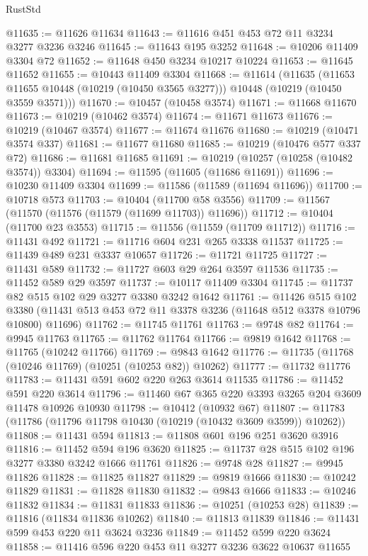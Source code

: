 \begin{lexlean}{RustStd}
\begin{coremodule}
@11635 := @11626 @11634
@11643 := @11616 @451 @453 @72 @11 @3234 @3277 @3236 @3246
@11645 := @11643 @195 @3252
@11648 := @10206 @11409 @3304 @72
@11652 := @11648 @450 @3234 @10217 @10224
@11653 := @11645 @11652
@11655 := @10443 @11409 @3304
@11668 := @11614
    (@11635
      (@11653 @11655 @10448 (@10219 (@10450 @3565 @3277)))
      @10448
      (@10219 (@10450 @3559 @3571)))
@11670 := @10457 (@10458 @3574)
@11671 := @11668 @11670
@11673 := @10219 (@10462 @3574)
@11674 := @11671 @11673
@11676 := @10219 (@10467 @3574)
@11677 := @11674 @11676
@11680 := @10219 (@10471 @3574 @337)
@11681 := @11677 @11680
@11685 := @10219 (@10476 @577 @337 @72)
@11686 := @11681 @11685
@11691 := @10219 (@10257 (@10258 (@10482 @3574)) @3304)
@11694 := @11595 (@11605 (@11686 @11691))
@11696 := @10230 @11409 @3304
@11699 := @11586 (@11589 (@11694 @11696))
@11700 := @10718 @573
@11703 := @10404 (@11700 @58 @3556)
@11709 := @11567 (@11570 (@11576 (@11579 (@11699 @11703)) @11696))
@11712 := @10404 (@11700 @23 @3553)
@11715 := @11556 (@11559 (@11709 @11712))
@11716 := @11431 @492
@11721 := @11716 @604 @231 @265 @3338 @11537
@11725 := @11439 @489 @231 @3337 @10657
@11726 := @11721 @11725
@11727 := @11431 @589
@11732 := @11727 @603 @29 @264 @3597 @11536
@11735 := @11452 @589 @29 @3597
@11737 := @10117 @11409 @3304
@11745 := @11737 @82 @515 @102 @29 @3277 @3380 @3242 @1642
@11761 := @11426
    @515
    @102
    @3380
    (@11431 @513 @453 @72 @11 @3378 @3236 (@11648 @512 @3378 @10796 @10800) @11696)
@11762 := @11745 @11761
@11763 := @9748 @82
@11764 := @9945 @11763
@11765 := @11762 @11764
@11766 := @9819 @1642
@11768 := @11765 (@10242 @11766)
@11769 := @9843 @1642
@11776 := @11735 (@11768 (@10246 @11769) (@10251 (@10253 @82)) @10262)
@11777 := @11732 @11776
@11783 := @11431 @591 @602 @220 @263 @3614 @11535
@11786 := @11452 @591 @220 @3614
@11796 := @11460 @67 @365 @220 @3393 @3265 @204 @3609 @11478 @10926 @10930
@11798 := @10412 (@10932 @67)
@11807 := @11783 (@11786 (@11796 @11798 @10430 (@10219 (@10432 @3609 @3599)) @10262))
@11808 := @11431 @594
@11813 := @11808 @601 @196 @251 @3620 @3916
@11816 := @11452 @594 @196 @3620
@11825 := @11737 @28 @515 @102 @196 @3277 @3380 @3242 @1666 @11761
@11826 := @9748 @28
@11827 := @9945 @11826
@11828 := @11825 @11827
@11829 := @9819 @1666
@11830 := @10242 @11829
@11831 := @11828 @11830
@11832 := @9843 @1666
@11833 := @10246 @11832
@11834 := @11831 @11833
@11836 := @10251 (@10253 @28)
@11839 := @11816 (@11834 @11836 @10262)
@11840 := @11813 @11839
@11846 := @11431 @599 @453 @220 @11 @3624 @3236
@11849 := @11452 @599 @220 @3624
@11858 := @11416 @596 @220 @453 @11 @3277 @3236 @3622 @10637 @11655

\end{coremodule}
\end{lexlean}
